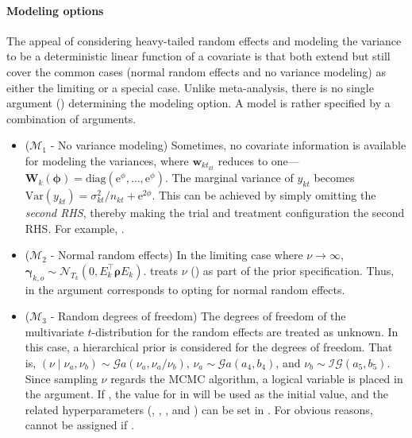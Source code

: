 \paragraph{Modeling options} The appeal of considering heavy-tailed random effects and modeling the variance to be a deterministic linear function of a covariate is that both extend but still cover the common cases (normal random effects and no variance modeling) as either the limiting or a special case. Unlike meta-analysis, there is no single argument () determining the modeling option. A model is rather specified by a combination of arguments.
\begin{itemize}
  \item ($\mathcal{M}_1$ - No variance modeling) Sometimes, no covariate information is available for modeling the variances, where $\boldsymbol{w}_{kt_{kt}}$ reduces to one---$\boldsymbol{W}_k(\boldsymbol{\phi}) = \mathrm{diag}(\mathrm{e}^\phi,\ldots,\mathrm{e}^\phi)$. The marginal variance of $y_{kt}$ becomes $\mathrm{Var}(y_{kt})=\sigma_{kt}^2/n_{kt}+\mathrm{e}^{2\phi}$. This can be achieved by simply omitting the \emph{second RHS}, thereby making the trial and treatment configuration the second RHS. For example, .
  \item ($\mathcal{M}_2$ - Normal random effects) In the limiting case where $\nu\to\infty$, $\bm{\gamma}_{k,o} \sim \mathcal{N}_{T_k}(0,E_k^\top \boldsymbol{\rho}E_k)$.  treats $\nu$ () as part of the prior specification. Thus,  in the  argument corresponds to opting for normal random effects.
  \item ($\mathcal{M}_3$ - Random degrees of freedom) The degrees of freedom of the multivariate $t$-distribution for the random effects are treated as unknown. In this case, a hierarchical prior is considered for the degrees of freedom. That is, $(\nu\mid \nu_a,\nu_b) \sim \mathcal{G}a(\nu_a,\nu_a/\nu_b)$, $\nu_a \sim \mathcal{G}a(a_4,b_4)$, and $\nu_b \sim \mathcal{IG}(a_5,b_5)$. Since sampling $\nu$ regards the MCMC algorithm, a logical variable  is placed in the  argument. If , the value for  in  will be used as the initial value, and the related hyperparameters (, , , and ) can be set in . For obvious reasons,  cannot be assigned  if .
\end{itemize}


